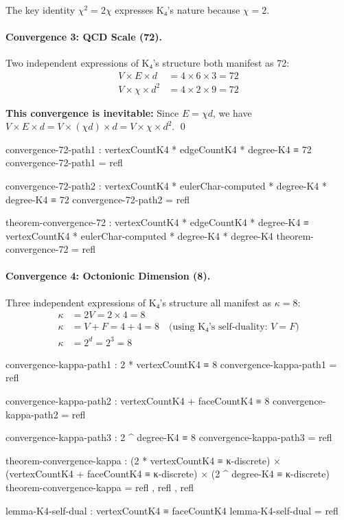 \documentclass[11pt,a4paper]{book}
\begin{document}
The key identity $\chi^2 = 2\chi$ expresses K₄'s nature because $\chi = 2$.

\paragraph{Convergence 3: QCD Scale (72).}

Two independent expressions of K₄'s structure both manifest as 72:
\begin{align}
V \times E \times d &= 4 \times 6 \times 3 = 72 \\
V \times \chi \times d^2 &= 4 \times 2 \times 9 = 72
\end{align}

\textbf{This convergence is inevitable:} Since $E = \chi d$, we have $V \times E \times d = V \times (\chi d) \times d = V \times \chi \times d^2$. \qed

\begin{code}
convergence-72-path1 : vertexCountK4 * edgeCountK4 * degree-K4 ≡ 72
convergence-72-path1 = refl

convergence-72-path2 : vertexCountK4 * eulerChar-computed * degree-K4 * degree-K4 ≡ 72
convergence-72-path2 = refl

theorem-convergence-72 : vertexCountK4 * edgeCountK4 * degree-K4 
                       ≡ vertexCountK4 * eulerChar-computed * degree-K4 * degree-K4
theorem-convergence-72 = refl
\end{code}

\paragraph{Convergence 4: Octonionic Dimension (8).}

Three independent expressions of K₄'s structure all manifest as $\kappa = 8$:
\begin{align}
\kappa &= 2V = 2 \times 4 = 8 \\
\kappa &= V + F = 4 + 4 = 8 \quad \text{(using K₄'s self-duality: } V = F \text{)} \\
\kappa &= 2^d = 2^3 = 8
\end{align}

\begin{code}
convergence-kappa-path1 : 2 * vertexCountK4 ≡ 8
convergence-kappa-path1 = refl

convergence-kappa-path2 : vertexCountK4 + faceCountK4 ≡ 8
convergence-kappa-path2 = refl

convergence-kappa-path3 : 2 ^ degree-K4 ≡ 8
convergence-kappa-path3 = refl

theorem-convergence-kappa : (2 * vertexCountK4 ≡ κ-discrete) × 
                            (vertexCountK4 + faceCountK4 ≡ κ-discrete) ×
                            (2 ^ degree-K4 ≡ κ-discrete)
theorem-convergence-kappa = refl , refl , refl

lemma-K4-self-dual : vertexCountK4 ≡ faceCountK4
lemma-K4-self-dual = refl
\end{code}
\end{document}
